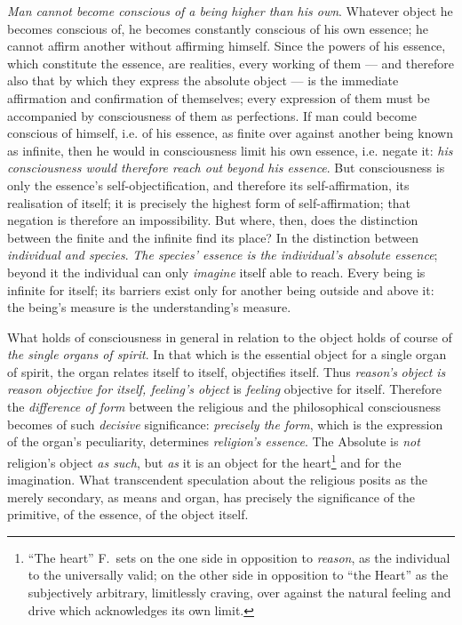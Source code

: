 \documentclass[12pt,a4paper]{book}
\begin{document}
\emph{Man cannot become conscious of a being higher than his own}. Whatever
object he becomes conscious of, he becomes constantly conscious of his own
essence; he cannot affirm another without affirming himself. Since the powers
of his essence, which constitute the essence, are realities, every working of
them --- and therefore also that by which they express the absolute object ---
is the immediate affirmation and confirmation of themselves; every expression
of them must be accompanied by consciousness of them as perfections. If man
could become conscious of himself, i.e. of his essence, as finite over against
another being known as infinite, then he would in consciousness limit his own
essence, i.e. negate it: \emph{his consciousness would therefore reach out
beyond his essence}. But consciousness is only the essence's
self-objectification, and therefore its self-affirmation, its realisation of
itself; it is precisely the highest form of self-affirmation; that negation is
therefore an impossibility. But where, then, does the distinction between the
finite and the infinite find its place? In the distinction between
\emph{individual and species}. \emph{The species' essence is the individual's
absolute essence}; beyond it the individual can only \emph{imagine} itself
able to reach. Every being is infinite for itself; its barriers exist only for
another being outside and above it: the being's measure is the understanding's
measure.

What holds of consciousness in general in relation to the object holds of
course of \emph{the single organs of spirit}. In that which is the essential
object for a single organ of spirit, the organ relates itself to itself,
objectifies itself. Thus \emph{reason's}
\setcounter{footnote}{0}%
\emph{object is reason objective for itself, feeling's object} is
\emph{feeling} objective for itself. Therefore the \emph{difference of form}
between the religious and the philosophical consciousness becomes of such
\emph{decisive} significance: \emph{precisely the form}, which is the
expression of the organ's peculiarity, determines \emph{religion's essence}.
The Absolute is \emph{not} religion's object \emph{as such}, but \emph{as} it
is an object for the heart\footnote{``The heart'' F.\ sets on the one side in
opposition to \emph{reason}, as the individual to the universally valid; on
the other side in opposition to ``the Heart'' as the subjectively arbitrary,
limitlessly craving, over against the natural feeling and drive which
acknowledges its own limit.} and for the imagination. What transcendent
speculation about the religious posits as the merely secondary, as means and
organ, has precisely the significance of the primitive, of the essence, of the
object itself.
\end{document}
